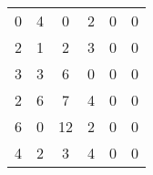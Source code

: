 \begin{tabular}{cccccc}
\rowcolor[rgb]{ .749,  .749,  .749} 0      & 4      & 0      & 2      & 0      & 0 \\
2      & 1      & 2      & \cellcolor[rgb]{ .749,  .749,  .749} 3 & \cellcolor[rgb]{ .749,  .749,  .749} 0 & \cellcolor[rgb]{ .749,  .749,  .749} 0 \\
3      & 3      & 6      & \cellcolor[rgb]{ .749,  .749,  .749} 0 & \cellcolor[rgb]{ .749,  .749,  .749} 0 & \cellcolor[rgb]{ .749,  .749,  .749} 0 \\
2      & 6      & 7      & \cellcolor[rgb]{ .749,  .749,  .749} 4 & \cellcolor[rgb]{ .749,  .749,  .749} 0 & \cellcolor[rgb]{ .749,  .749,  .749} 0 \\
\rowcolor[rgb]{ .749,  .749,  .749} 6      & 0      & 12     & 2      & 0      & 0 \\
4      & 2      & 3      & \cellcolor[rgb]{ .749,  .749,  .749} 4 & \cellcolor[rgb]{ .749,  .749,  .749} 0 & \cellcolor[rgb]{ .749,  .749,  .749} 0 \bigstrut[b]\\
\hline
\hline
\end{tabular}%
